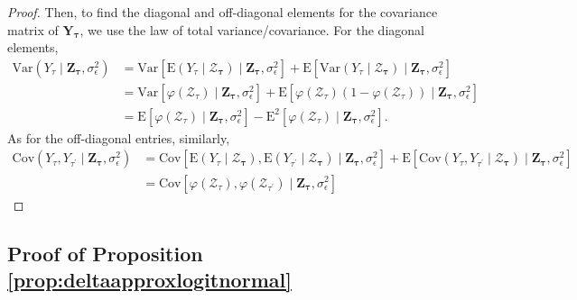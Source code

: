 \begin{proof}
 
Then, to find the diagonal and off-diagonal elements for the covariance matrix of $\mathbf{Y}_{\boldsymbol{\tau}}$, we use the law of total variance/covariance. For the diagonal elements,
\begin{equation}
    \begin{split}
        \text{Var}(Y_{\tau}\mid\mathbf{Z}_{\boldsymbol{\tau}},\sigma_{\epsilon}^2)&=\text{Var}[\text{E}(Y_{\tau}\mid \mathcal{Z}_{\boldsymbol{\tau}})\mid\mathbf{Z}_{\boldsymbol{\tau}},\sigma_{\epsilon}^2]+\text{E}[\text{Var}(Y_{\tau}\mid \mathcal{Z}_{\boldsymbol{\tau}})\mid\mathbf{Z}_{\boldsymbol{\tau}},\sigma_{\epsilon}^2]\\
        &=\text{Var}[\varphi(\mathcal{Z}_{\tau})\mid\mathbf{Z}_{\boldsymbol{\tau}},\sigma_{\epsilon}^2]+\text{E}[\varphi(\mathcal{Z}_{\tau})(1-\varphi(\mathcal{Z}_{\tau}))\mid \mathbf{Z}_{\boldsymbol{\tau}},\sigma_{\epsilon}^2]\\
        &=\text{E}[\varphi(\mathcal{Z}_{\tau})\mid \mathbf{Z}_{\boldsymbol{\tau}},\sigma_{\epsilon}^2]-\text{E}^2[\varphi(\mathcal{Z}_{\tau})\mid \mathbf{Z}_{\boldsymbol{\tau}},\sigma_{\epsilon}^2].
    \end{split}
    \label{eq:varcondsignal}
\end{equation}
As for the off-diagonal entries, similarly,
\begin{equation}
    \begin{split}
        \text{Cov}(Y_{\tau},Y_{\tau^{\prime}}\mid\mathbf{Z}_{\boldsymbol{\tau}},\sigma_{\epsilon}^2)&=\text{Cov}[\text{E}(Y_{\tau}\mid \boldsymbol{\mathcal{Z}}_{\boldsymbol{\tau}}),\text{E}(Y_{\tau^{\prime}}\mid \boldsymbol{\mathcal{Z}}_{\boldsymbol{\tau}})\mid\mathbf{Z}_{\boldsymbol{\tau}},\sigma_{\epsilon}^2]+\text{E}[\text{Cov}(Y_{\tau},Y_{\tau^{\prime}}\mid \boldsymbol{\mathcal{Z}}_{\boldsymbol{\tau}})\mid\mathbf{Z}_{\boldsymbol{\tau}},\sigma_{\epsilon}^2]\\
        &=\text{Cov}[\varphi(\mathcal{Z}_{\tau}),\varphi(\mathcal{Z}_{\tau^{\prime}})\mid\mathbf{Z}_{\boldsymbol{\tau}},\sigma_{\epsilon}^2]
    \end{split}
    \label{eq:covcondsignal}
\end{equation}
\end{proof}


\subsection*{Proof of Proposition \ref{prop:deltaapproxlogitnormal}}
\label{subsec:proofdeltaapprox}

